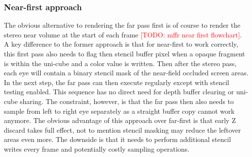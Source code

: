 \subsubsection{Near-first approach}
The obvious alternative to rendering the far pass first is of course to render the stereo near volume at the start of each frame \textcolor{red}{[TODO: mffr near first flowchart]}. A key difference to the former approach is that for near-first to work correctly, this first pass also needs to flag then stencil buffer pixel when a opaque fragment is within the uni-cube and a color value is written. Then after the stereo pass, each eye will contain a binary stencil mask of the near-field occluded screen areas. In the next step, the far pass can then execute regularly except with stencil testing enabled. This sequence has no direct need for depth buffer clearing or uni-cube sharing. The constraint, however, is that the far pass then also needs to sample from left to right eye separately as a straight buffer copy cannot work anymore. 
The obvious advantage of this approach over far-first is that early Z discard takes full effect, not to mention stencil masking may reduce the leftover areas even more. The downside is that it needs to perform additional stencil writes every frame and potentially costly sampling operations. 
